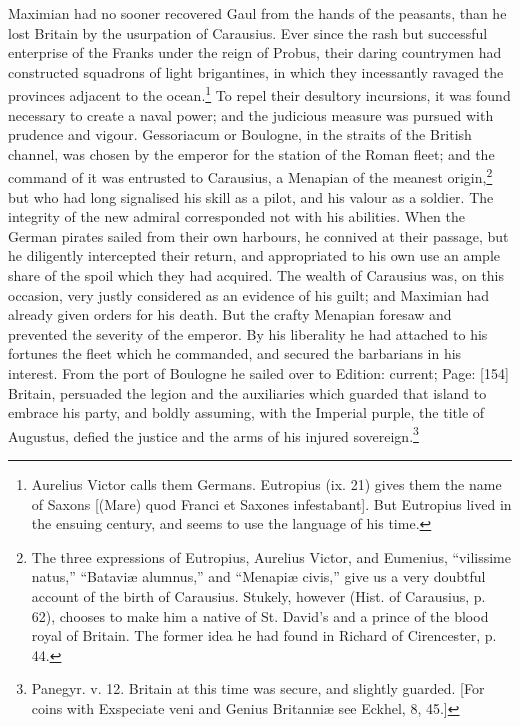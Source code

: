 Maximian had no sooner recovered Gaul from the hands of the peasants, than he lost Britain by the usurpation of Carausius. Ever since the rash but successful enterprise of the Franks under the reign of Probus, their daring countrymen had constructed squadrons of light brigantines, in which they incessantly ravaged the provinces adjacent to the ocean.\footnote{Aurelius Victor calls them Germans. Eutropius (ix. 21) gives them the name of Saxons [(Mare) quod Franci et Saxones infestabant]. But Eutropius lived in the ensuing century, and seems to use the language of his time.} To repel their desultory incursions, it was found necessary to create a naval power; and the judicious measure was pursued with prudence and vigour. Gessoriacum or Boulogne, in the straits of the British channel, was chosen by the emperor for the station of the Roman fleet; and the command of it was entrusted to Carausius, a Menapian of the meanest origin,\footnote{The three expressions of Eutropius, Aurelius Victor, and Eumenius, \texthebrew{“}vilissime natus,\texthebrew{” “}Bataviæ alumnus,\texthebrew{}” and \texthebrew{“}Menapiæ civis,\texthebrew{}” give us a very doubtful account of the birth of Carausius. Stukely, however (Hist. of Carausius, p. 62), chooses to make him a native of St. David\texthebrew{}’s and a prince of the blood royal of Britain. The former idea he had found in Richard of Cirencester, p. 44.} but who had long signalised his skill as a pilot, and his valour as a soldier. The integrity of the new admiral corresponded not with his abilities. When the German pirates sailed from their own harbours, he connived at their passage, but he diligently intercepted their return, and appropriated to his own use an ample share of the spoil which they had acquired. The wealth of Carausius was, on this occasion, very justly considered as an evidence of his guilt; and Maximian had already given orders for his death. But the crafty Menapian foresaw and prevented the severity of the emperor. By his liberality he had attached to his fortunes the fleet which he commanded, and secured the barbarians in his interest. From the port of Boulogne he sailed over to Edition: current; Page: [154] Britain, persuaded the legion and the auxiliaries which guarded that island to embrace his party, and boldly assuming, with the Imperial purple, the title of Augustus, defied the justice and the arms of his injured sovereign.\footnote{Panegyr. v. 12. Britain at this time was secure, and slightly guarded. [For coins with Exspeciate veni and Genius Britanniæ see Eckhel, 8, 45.]}

